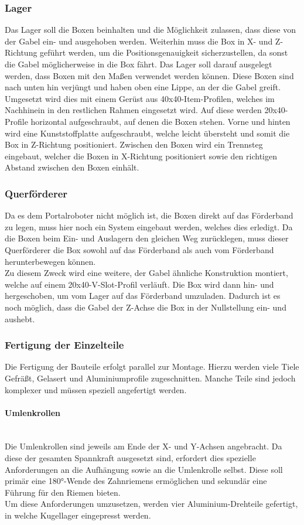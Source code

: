 \subsubsection{Lager}
Das Lager soll die Boxen beinhalten und die Möglichkeit zulassen, dass diese von der Gabel ein- und ausgehoben werden. Weiterhin muss die Box in X- und Z-Richtung geführt werden, um die Positionsgenauigkeit sicherzustellen, da sonst die Gabel möglicherweise in die Box fährt. Das Lager soll darauf ausgelegt werden, dass Boxen mit den Maßen  verwendet werden können. Diese Boxen sind nach unten hin verjüngt und haben oben eine Lippe, an der die Gabel greift.
Umgesetzt wird dies mit einem Gerüst aus 40x40-Item-Profilen, welches im Nachhinein in den restlichen Rahmen eingesetzt wird. Auf diese werden 20x40-Profile horizontal aufgeschraubt, auf denen die Boxen stehen. Vorne und hinten wird eine Kunststoffplatte aufgeschraubt, welche leicht übersteht und somit die Box in Z-Richtung positioniert. Zwischen den Boxen wird ein Trennsteg eingebaut, welcher die Boxen in X-Richtung positioniert sowie den richtigen Abstand zwischen den Boxen einhält.

\subsubsection{Querförderer}
Da es dem Portalroboter nicht möglich ist, die Boxen direkt auf das Förderband zu legen, muss hier noch ein System eingebaut werden, welches dies erledigt. Da die Boxen beim Ein- und Auslagern den gleichen Weg zurücklegen, muss dieser Querförderer die Box sowohl auf das Förderband als auch vom Förderband herunterbewegen können.\\
Zu diesem Zweck wird eine weitere, der Gabel ähnliche Konstruktion montiert, welche auf einem 20x40-V-Slot-Profil verläuft. Die Box wird dann hin- und hergeschoben, um vom Lager auf das Förderband umzuladen. Dadurch ist es noch möglich, dass die Gabel der Z-Achse die Box in der Nullstellung ein- und aushebt.


\subsubsection{Fertigung der Einzelteile}\nobreak
Die Fertigung der Bauteile erfolgt parallel zur Montage. Hierzu werden viele Tiele Gefräßt, Gelasert und Aluminiumprofile zugeschnitten. Manche Teile sind jedoch komplexer und müssen speziell angefertigt werden.

\paragraph{Umlenkrollen}\mbox{}\\
Die Umlenkrollen sind jeweils am Ende der X- und Y-Achsen angebracht. Da diese der gesamten Spannkraft ausgesetzt sind, erfordert dies spezielle Anforderungen an die Aufhängung sowie an die Umlenkrolle selbst. Diese soll primär eine 180°-Wende des Zahnriemens ermöglichen und sekundär eine Führung für den Riemen bieten.\\
Um diese Anforderungen umzusetzen, werden vier Aluminium-Drehteile gefertigt, in welche Kugellager eingepresst werden.

